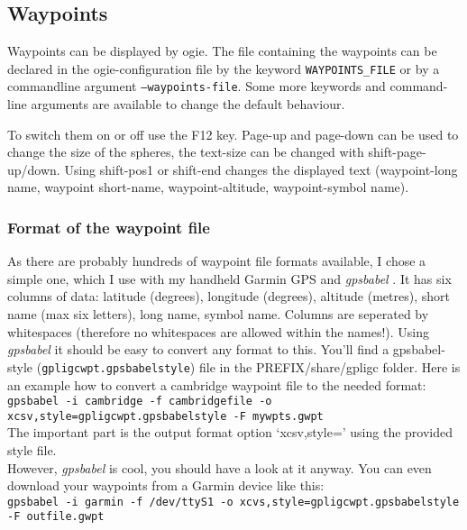 \subsection{Waypoints}
\label{wp}

Waypoints can be displayed by ogie.
The file containing the waypoints can be declared in the ogie-configuration file by the keyword \texttt{WAYPOINTS\_FILE} or by a commandline argument \texttt{--waypoints-file}. Some more keywords and command-line arguments are available to change the default behaviour.

To switch them on or off use the F12 key. Page-up and page-down can be used to change the size of the spheres, the text-size can be changed with shift-page-up/down. Using shift-pos1 or shift-end changes the displayed text (waypoint-long name, waypoint short-name, waypoint-altitude, waypoint-symbol name).

\subsubsection{Format of the waypoint file}
As there are probably hundreds of waypoint file formats available, I chose a simple one, which I use with my handheld Garmin GPS and \emph{gpsbabel} \cite{gpsbabel}.
It has six columns of data: latitude (degrees), longitude (degrees), altitude (metres), short name (max six letters), long name, symbol name.
Columns are seperated by whitespaces (therefore no whitespaces are allowed within the names!).
Using \emph{gpsbabel} it should be easy to convert any format to this.
You'll find a gpsbabel-style (\texttt{gpligcwpt.gpsbabelstyle}) file in the PREFIX/share/gpligc folder.
Here is an example how to convert a cambridge waypoint file to the needed format:\\

\texttt{gpsbabel -i cambridge -f cambridgefile  -o xcsv,style=gpligcwpt.gpsbabelstyle -F mywpts.gwpt}\\
The important part is the output format option `xcsv,style=' using the provided style file.\\
However, \emph{gpsbabel} is cool, you should have a look at it anyway.
You can even download your waypoints from a Garmin device like this:\\
\texttt{gpsbabel -i garmin -f /dev/ttyS1 -o xcvs,style=gpligcwpt.gpsbabelstyle -F outfile.gwpt}
